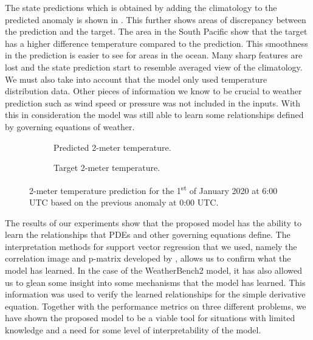 The state predictions which is obtained by adding the climatology to the predicted anomaly is shown in . This further shows areas of discrepancy between the prediction and the target. The area in the South Pacific show that the target has a higher difference temperature compared to the prediction. This smoothness in the prediction is easier to see for areas in the ocean. Many sharp features are lost and the state prediction start to resemble averaged view of the climatology. We must also take into account that the model only used temperature distribution data. Other pieces of information we know to be crucial to weather prediction such as wind speed or pressure was not included in the inputs. With this in consideration the model was still able to learn some relationships defined by governing equations of weather.
\begin{figure}[H]
  \centering
  \begin{subfigure}{\linewidth}
    \begin{adjustbox}{width=\linewidth}
      
    \end{adjustbox}
    \caption{Predicted 2-meter temperature.}\label{fig:sc3_state_pred}
  \end{subfigure}
  \begin{subfigure}{\linewidth}
    \begin{adjustbox}{width=\linewidth}
      
    \end{adjustbox}
    \caption{Target 2-meter temperature.}\label{fig:sc3_state_target}
  \end{subfigure}
  \caption{2-meter temperature prediction for the 1\textsuperscript{st} of January 2020 at 6:00 UTC based on the previous anomaly at 0:00 UTC.}\label{fig:sc3_state_predictions}
\end{figure}

The results of our experiments show that the proposed model has the ability to learn the relationships that PDEs and other governing equations define. The interpretation methods for support vector regression that we used, namely the correlation image and p-matrix developed by \textcite{ustunVisualisationInterpretationSupport2007}, allows us to confirm what the model has learned. In the case of the WeatherBench2 model, it has also allowed us to glean some insight into some mechanisms that the model has learned. This information was used to verify the learned relationships for the simple derivative equation. Together with the performance metrics on three different problems, we have shown the proposed model to be a viable tool for situations with limited knowledge and a need for some level of interpretability of the model.
